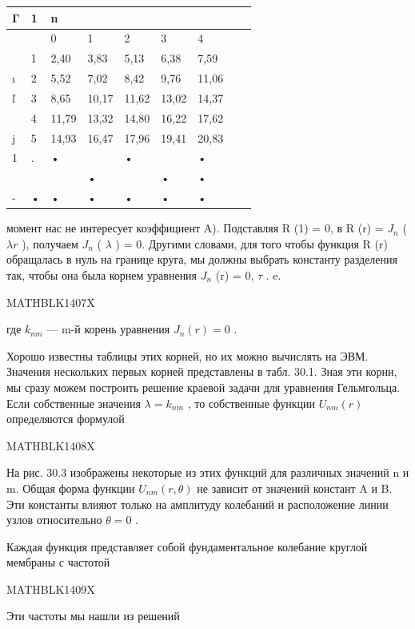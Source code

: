 \documentclass[
]{article}
\newcounter{none} %
\begin{document}
{\def\LTcaptype{none} %
\begin{longtable}[]{@{}lllllllll@{}}
\toprule\noalign{}
Γ & 1 & n & & & & & & \\
\midrule\noalign{}
\endhead
\bottomrule\noalign{}
\endlastfoot
& & 0 & 1 & 2 & 3 & 4 & & \\
& 1 & 2,40 & 3,83 & 5,13 & 6,38 & 7,59 & & \\
ı & 2 & 5,52 & 7,02 & 8,42 & 9,76 & 11,06 & & \\
ľ & 3 & 8,65 & 10,17 & 11,62 & 13,02 & 14,37 & & \\
& 4 & 11,79 & 13,32 & 14,80 & 16,22 & 17,62 & & \\
j & 5 & 14,93 & 16,47 & 17,96 & 19,41 & 20,83 & & \\
1 & . & • & & • & & • & & \\
& & & • & & • & • & & \\
- & • & • & • & • & • & • & & \\
\end{longtable}
}

момент нас не интересует коэффициент A). Подставляя R (1) = 0, в R (r) =
\(J_n\) ( \(\lambda r\) ), получаем \(J_n\) ( \(\lambda\) ) = 0. Другими
словами, для того чтобы функция R (r) обращалась в нуль на границе
круга, мы должны выбрать константу разделения так, чтобы она была корнем
уравнения \(J_n\) (r) = 0, \(\tau\) . e.

MATHBLK1407X

где \(k_{nm}\) --- m-й корень уравнения \(J_n(r) = 0\) .

Хорошо известны таблицы этих корней, но их можно вычислять на ЭВМ.
Значения нескольких первых корней представлены в табл. 30.1. Зная эти
корни, мы сразу можем построить решение краевой задачи для уравнения
Гельмгольца. Если собственные значения \(\lambda = k_{nm}\) , то
собственные функции \(U_{ nm}(r)\) определяются формулой

MATHBLK1408X

На рис. 30.3 изображены некоторые из этих функций для различных значений
n и m. Общая форма функции \(U_{nm}(r,\theta)\) не зависит от значений
констант A и B. Эти константы влияют только на амплитуду колебаний и
расположение линии узлов относительно \(\theta=0\) .

Каждая функция представляет собой фундаментальное колебание круглой
мембраны с частотой

MATHBLK1409X

Эти частоты мы нашли из решений
\end{document}
